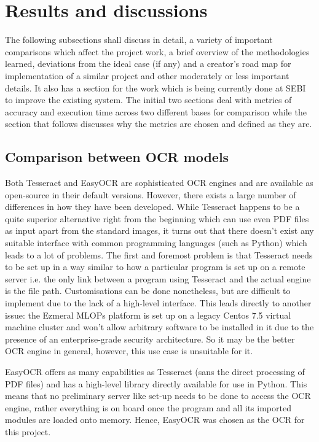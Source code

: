 \chapter{Results and discussions} \label{chapter5}

The following subsections shall discuss in detail, a variety of important comparisons which affect the project work, a brief overview of the methodologies learned, deviations from the ideal case (if any) and a creator’s road map for implementation of a similar project and other moderately or less important details. It also has a section for the work which is being currently done at SEBI to improve the existing system. The initial two sections deal with metrics of accuracy and execution time across two different bases for comparison while the section that follows discusses why the metrics are chosen and defined as they are. \par

\section{Comparison between OCR models} \label{comp_ocr}

Both Tesseract and EasyOCR are sophisticated OCR engines and are available as open-source in their default versions. However, there exists a large number of differences in how they have been developed. While Tesseract \cite{Google2015} happens to be a quite superior alternative right from the beginning which can use even PDF files as input apart from the standard images, it turns out that there doesn’t exist any suitable interface with common programming languages (such as Python) which leads to a lot of problems. The first and foremost problem is that Tesseract needs to be set up in a way similar to how a particular program is set up on a remote server i.e. the only link between a program using Tesseract and the actual engine is the file path. Customisations can be done nonetheless, but are difficult to implement due to the lack of a high-level interface. This leads directly to another issue: the Ezmeral MLOPs platform is set up on a legacy Centos 7.5 virtual machine cluster and won’t allow arbitrary software to be installed in it due to the presence of an enterprise-grade security architecture.  So it may be the better OCR engine in general, however, this use case is unsuitable for it.\par

EasyOCR offers as many capabilities \cite{Jaided2020} as Tesseract (sans the direct processing of PDF files) and has a high-level library directly available for use in Python. This means that no preliminary server like set-up needs to be done to access the OCR engine, rather everything is on board once the program and all its imported modules are loaded onto memory. Hence, EasyOCR was chosen as the OCR for this project. \par

